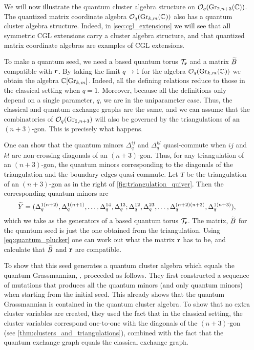 We will now illustrate the quantum cluster algebra structure on $\mathcal{O}_q(\operatorname{Gr}_{2,
			n+3}(\mathbb{C}))$. The quantized matrix coordinate algebra $\mathcal{O}_q(\operatorname{Gr}_{k, m}(\mathbb{C}))$ also
has a quantum cluster algebra structure. Indeed, in \cref{sec:cgl_extensions} we will
see that all symmetric CGL extensions carry a cluster algebra structure, and that
quantized matrix coordinate algebras are examples of CGL extensions.

\medskip

To make a quantum seed, we need a based quantum torus $\mathcal{T}_{\mathbf{r}}$ and a matrix $\widetilde{B}$
compatible with $\mathbf{r}$. By taking the limit $q\to 1$ for the algebra $\mathcal{O}_q(\operatorname{Gr}_{k,
			m}(\mathbb{C}))$ we obtain the algebra $\mathbb{C}[\operatorname{Gr}_{k,m}]$. Indeed, all the defining relations
reduce to those in the classical setting when $q = 1$. Moreover, because all the
definitions only depend on a single parameter, $q$, we are in the uniparameter case.
Thus, the classical and quantum exchange graphs are the same, and we can assume that
the combinatorics of $\mathcal{O}_q(\operatorname{Gr}_{2, n+3})$ will also be governed by the triangulations
of an $(n+3)$-gon. This is precisely what happens.

One can show that the quantum minors $\Delta_q^{ij}$ and $\Delta_q^{kl}$ quasi-commute
when $ij$ and $kl$ are non-crossing diagonals of an $(n+3)$-gon. Thus, for any
triangulation of an $(n+3)$-gon, the quantum minors corresponding to the diagonals of
the triangulation and the boundary edges quasi-commute. Let $T$ be the triangulation of
an $(n+3)$-gon as in the right of \cref{fig:triangulation_quiver}. Then the
corresponding quantum minors are
\begin{equation*}
	\widetilde{Y} = (\Delta_q^{1(n+2)}, \Delta_q^{1(n+1)}, \dotsc, \Delta_q^{14}, \Delta_q^{13}; \Delta_q^{12}, \Delta_q^{23}, \dotsc, \Delta_q^{(n+2)(n+3)}, \Delta_q^{1(n+3)}),
\end{equation*}
%
which we take as the generators of a based quantum torus $\mathcal{T}_{\mathbf{r}}$. The matrix,
$\widetilde{B}$ for the quantum seed is just the one obtained from the triangulation. Using
\cref{eq:quantum_plucker} one can work out what the matrix $\mathbf{r}$ has to be, and
calculate that $\widetilde{B}$ and $\mathbf{r}$ are compatible.

To show that this seed generates a quantum cluster algebra which equals the quantum
Grassmannian, \textcite{GrabowskiLaunois2011QCAonQuantumGrassmannians}, proceeded as
follows. They first constructed a sequence of mutations that produces all the quantum
minors (and only quantum minors) when starting from the initial seed. This already
shows that the quantum Grassmannian is contained in the quantum cluster algebra. To
show that no extra cluster variables are created, they used the fact that in the
classical setting, the cluster variables correspond one-to-one with the diagonals of
the $(n+3)$-gon (see \cref{thm:clusters_and_triangulations}), combined with the fact
that the quantum exchange graph equals the classical exchange graph.

